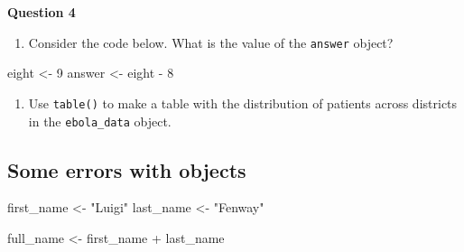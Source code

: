 \documentclass[
  letterpaper,
  DIV=11,
  numbers=noendperiod]{scrreprt}
\newenvironment{Shaded}{\begin{snugshade}}{\end{snugshade}}
\newcommand{\DecValTok}[1]{\textcolor[rgb]{0.68,0.00,0.00}{#1}}
\newcommand{\NormalTok}[1]{\textcolor[rgb]{0.00,0.23,0.31}{#1}}
\newcommand{\OtherTok}[1]{\textcolor[rgb]{0.00,0.23,0.31}{#1}}
\newcommand{\SpecialCharTok}[1]{\textcolor[rgb]{0.37,0.37,0.37}{#1}}
\newcommand{\StringTok}[1]{\textcolor[rgb]{0.13,0.47,0.30}{#1}}
\providecommand{\tightlist}{%
  \setlength{\itemsep}{0pt}\setlength{\parskip}{0pt}}\usepackage{longtable,booktabs,array}
\begin{document}
\begin{tcolorbox}[enhanced jigsaw, title=\textcolor{quarto-callout-tip-color}{\faLightbulb}\hspace{0.5em}{Practice}, colbacktitle=quarto-callout-tip-color!10!white, leftrule=.75mm, arc=.35mm, opacityback=0, bottomrule=.15mm, rightrule=.15mm, toptitle=1mm, breakable, toprule=.15mm, colback=white, coltitle=black, colframe=quarto-callout-tip-color-frame, bottomtitle=1mm, titlerule=0mm, left=2mm, opacitybacktitle=0.6]

\textbf{Question 4}

\begin{enumerate}
\def\labelenumi{\alph{enumi}.}
\tightlist
\item
  Consider the code below. What is the value of the \texttt{answer}
  object?
\end{enumerate}

\begin{Shaded}
\begin{Highlighting}[]
\NormalTok{eight }\OtherTok{\textless{}{-}} \DecValTok{9}
\NormalTok{answer }\OtherTok{\textless{}{-}}\NormalTok{ eight }\SpecialCharTok{{-}} \DecValTok{8}
\end{Highlighting}
\end{Shaded}

\begin{enumerate}
\def\labelenumi{\alph{enumi}.}
\setcounter{enumi}{1}
\tightlist
\item
  Use \texttt{table()} to make a table with the distribution of patients
  across districts in the \texttt{ebola\_data} object.
\end{enumerate}

\end{tcolorbox}

\subsection{Some errors with objects}\label{some-errors-with-objects}

\begin{Shaded}
\begin{Highlighting}[]
\NormalTok{first\_name }\OtherTok{\textless{}{-}} \StringTok{"Luigi"}
\NormalTok{last\_name }\OtherTok{\textless{}{-}} \StringTok{"Fenway"}
\end{Highlighting}
\end{Shaded}

\begin{Shaded}
\begin{Highlighting}[]
\NormalTok{full\_name }\OtherTok{\textless{}{-}}\NormalTok{ first\_name }\SpecialCharTok{+}\NormalTok{ last\_name}
\end{Highlighting}
\end{Shaded}
\end{document}
